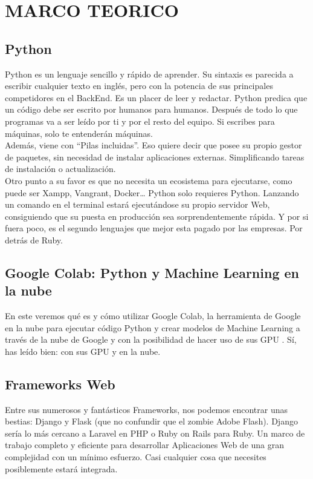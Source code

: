 \section{MARCO TEORICO} 


\subsection{Python}
	
Python es un lenguaje sencillo y rápido de aprender. Su sintaxis es parecida a escribir cualquier texto en inglés, pero con la potencia de sus principales competidores en el BackEnd.
Es un placer de leer y redactar. Python predica que un código debe ser escrito por humanos para humanos. Después de todo lo que programas va a ser leído por ti y por el resto del equipo. Si escribes para máquinas, solo te entenderán máquinas.
\\
Además, viene con “Pilas incluidas”. Eso quiere decir que posee su propio gestor de paquetes, sin necesidad de instalar aplicaciones externas. Simplificando tareas de instalación o actualización.
\\
Otro punto a su favor es que no necesita un ecosistema para ejecutarse, como puede ser Xampp, Vangrant, Docker… Python solo requieres Python. Lanzando un comando en el terminal estará ejecutándose su propio servidor Web, consiguiendo que su puesta en producción sea sorprendentemente rápida.
Y por si fuera poco, es el segundo lenguajes que mejor esta pagado por las empresas. Por detrás de Ruby.

\subsection{Google Colab: Python y Machine Learning en la nube}
En este veremos qué es y cómo utilizar Google Colab, la herramienta de Google en la nube para ejecutar código Python y crear modelos de Machine Learning a través de la nube de Google y con la posibilidad de hacer uso de sus GPU . Sí, has leído bien: con sus GPU y en la nube.


		
\subsection{Frameworks Web}

Entre sus numerosos y fantásticos Frameworks, nos podemos encontrar unas bestias: Django y Flask (que no confundir que el zombie Adobe Flash).
Django sería lo más cercano a Laravel en PHP o Ruby on Rails para Ruby. Un marco de trabajo completo y eficiente para desarrollar Aplicaciones Web de una gran complejidad con un mínimo esfuerzo. Casi cualquier cosa que necesites posiblemente estará integrada.
\\

